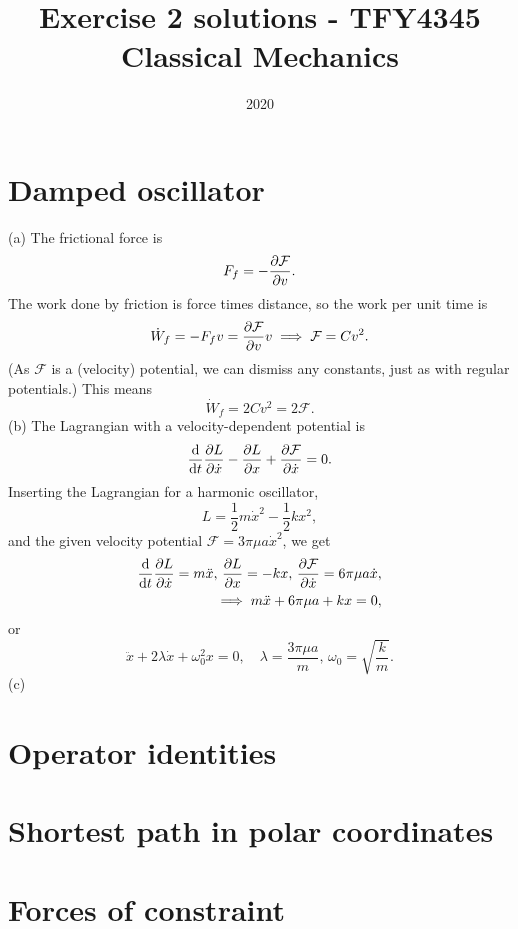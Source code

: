 \documentclass{article}
\title{Exercise 2 solutions - TFY4345 Classical Mechanics}
\date{2020}
\newcommand{\Eff}{\mathcal{F}}
\begin{document}
    \maketitle
    \section{Damped oscillator}
        (a) The frictional force is 
        \begin{equation*}
            F_f = -\pdv{\mathcal{F}}{v}.
        \end{equation*}
        The work done by friction is force times distance, so the work per unit time is
        \begin{equation*}
            \dot W_f = - F_f v = \pdv{\mathcal{F}}{v} v \implies \mathcal{F} = C v^2.
        \end{equation*}
        (As $\mathcal{F}$ is a (velocity) potential, we can dismiss any constants, just as with regular potentials.) This means
        \begin{equation*}
            \dot W_f = 2 C v^2 = 2 \mathcal{F}. 
        \end{equation*}
        (b) The Lagrangian with a velocity-dependent potential is 
        \begin{equation*}
            \dv{t} \pdv{L}{\dot x} - \pdv{L}{x} + \pdv{\Eff}{\dot x} = 0.
        \end{equation*}
        Inserting the Lagrangian for a harmonic oscillator, 
        \begin{equation*}
            L = \frac{1}{2} m \dot x^2 - \frac{1}{2} k x^2,
        \end{equation*}
        and the given velocity potential $\Eff = 3 \pi \mu a \dot x^2$, we get
        \begin{align*}
            \dv{t} \pdv{L}{\dot x} = m \ddot x, \, \pdv{L}{x} = -k x, \, \pdv{\Eff}{\dot x} = 6 \pi \mu a \dot x, \\
            \implies m \ddot x + 6 \pi \mu a + k x = 0,
        \end{align*}
        or
        \begin{equation*}
            \ddot x + 2 \lambda \dot x + \omega^2_0x = 0, \quad \lambda = \frac{3 \pi \mu a}{m}, \, \omega_0 = \sqrt{\frac{k}{m}}.
        \end{equation*}
        (c) 

    \section{Operator identities}

    \section{Shortest path in polar coordinates}

    \section{Forces of constraint}
\end{document}
